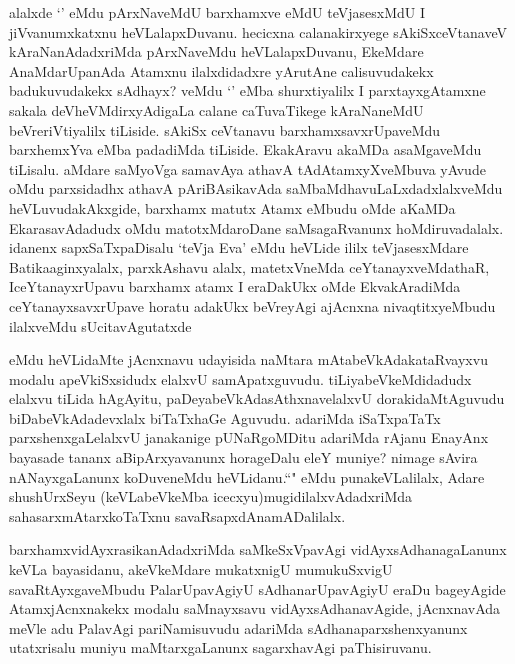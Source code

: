 \begin{artha}
alalxde `\stext' eMdu pArxNaveMdU barxhamxve eMdU teVjasesxMdU I jiVvanumxkatxnu heVLalapxDuvanu. hecicxna calanakirxyege sAkiSxceVtanaveV kAraNanAdadxriMda pArxNaveMdu heVLalapxDuvanu, EkeMdare AnaMdarUpanAda Atamxnu ilalxdidadxre yArutAne calisuvudakekx badukuvudakekx sAdhayx? veMdu `\stext' eMba shurxtiyalilx I parxtayxgAtamxne sakala deVheVMdirxyAdigaLa calane caTuvaTikege kAraNaneMdU beVreriVtiyalilx tiLiside. sAkiSx ceVtanavu barxhamxsavxrUpaveMdu barxhemxYva eMba padadiMda tiLiside. EkakAravu akaMDa asaMgaveMdu tiLisalu. aMdare saMyoVga samavAya athavA tAdAtamxyXveMbuva yAvude oMdu parxsidadhx athavA pAriBAsikavAda saMbaMdhavuLaLxdadxlalxveMdu heVLuvudakAkxgide, barxhamx matutx Atamx eMbudu oMde aKaMDa EkarasavAdadudx oMdu matotxMdaroDane saMsagaRvanunx hoMdiruvadalalx. idanenx sapxSaTxpaDisalu `teVja Eva' eMdu heVLide ililx teVjasesxMdare Batikaaginxyalalx, parxkAshavu alalx, matetxVneMda ceYtanayxveMdathaR, IceYtanayxrUpavu barxhamx atamx I eraDakUkx oMde EkvakAradiMda ceYtanayxsavxrUpave horatu adakUkx beVreyAgi ajAcnxna nivaqtitxyeMbudu ilalxveMdu sUcitavAgutatxde
\end{artha}

\begin{artha}
eMdu heVLidaMte jAcnxnavu udayisida naMtara mAtabeVkAdakataRvayxvu modalu apeVkiSxsidudx elalxvU samApatxguvudu. tiLiyabeVkeMdidadudx elalxvu tiLida hAgAyitu, paDeyabeVkAdasAthxnavelalxvU dorakidaMtAguvudu biDabeVkAdadevxlalx biTaTxhaGe Aguvudu. adariMda iSaTxpaTaTx parxshenxgaLelalxvU janakanige pUNaRgoMDitu adariMda rAjanu EnayAnx bayasade tananx aBipArxyavanunx horageDalu eleY muniye? nimage sAvira nANayxgaLanunx koDuveneMdu heVLidanu.``\stext" eMdu punakeVLalilalx, Adare shushUrxSeyu (keVLabeVkeMba icecxyu)mugidilalxvAdadxriMda sahasarxmAtarxkoTaTxnu savaRsapxdAnamADalilalx.
\end{artha}

\begin{artha}
barxhamxvidAyxrasikanAdadxriMda saMkeSxVpavAgi vidAyxsAdhanagaLanunx keVLa bayasidanu, akeVkeMdare mukatxnigU mumukuSxvigU savaRtAyxgaveMbudu PalarUpavAgiyU sAdhanarUpavAgiyU eraDu bageyAgide AtamxjAcnxnakekx modalu saMnayxsavu vidAyxsAdhanavAgide, jAcnxnavAda meVle adu PalavAgi pariNamisuvudu adariMda sAdhanaparxshenxyanunx utatxrisalu muniyu maMtarxgaLanunx sagarxhavAgi paThisiruvanu.
\end{artha}
